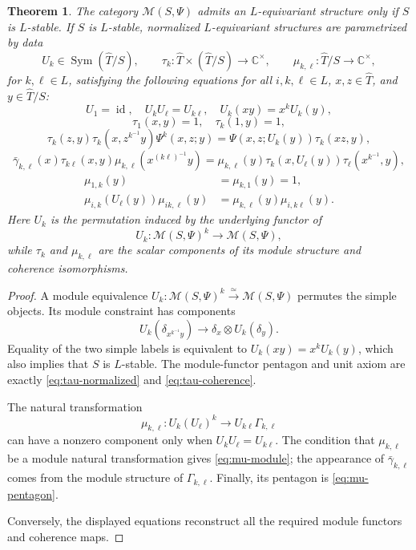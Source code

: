\documentclass{amsart}
\newtheorem{theorem}{Theorem}[section]
\theoremstyle{definition}
\newcommand{\id}{\operatorname{id}}
\newcommand{\M}{\mathscr{M}}
\newcommand{\Ctimes}{\mathbb{C}^{\times}}
\numberwithin{equation}{section}
\begin{document}
\begin{theorem}\label{thm:explicit-equivariant-data}
The category $\M(S,\Psi)$ admits an $L$-equivariant structure only if $S$ is
$L$-stable.  If $S$ is $L$-stable, normalized $L$-equivariant structures are
parametrized by data
\[
 U_k\in\operatorname{Sym}(\widehat{T}/S),
 \qquad
 \tau_k:\widehat{T}\times (\widehat{T}/S)\to\Ctimes,
 \qquad
 \mu_{k,\ell}:\widehat{T}/S\to\Ctimes,
\]
for $k,\ell\in L$, satisfying the following equations for all
$i,k,\ell\in L$, $x,z\in \widehat{T}$, and $y\in \widehat{T}/S$:
\begin{equation}
 U_1=\id,\quad
 U_kU_\ell=U_{k\ell},\quad
 U_k(xy)=x^kU_k(y),
 \label{eq:U-data}
 \end{equation}
 \begin{equation}
 \tau_1(x,y)=1,\quad
 \tau_k(1,y)=1,
 \label{eq:tau-normalized}
\end{equation}
\begin{equation}\label{eq:tau-coherence}
 \tau_k(z,y)\tau_k(x,z^{k^{-1}}y)\Psi^k(x,z;y)
 =\Psi(x,z;U_k(y))\tau_k(xz,y),
\end{equation}
\begin{equation}\label{eq:mu-module}
 \bar\gamma_{k,\ell}(x)\tau_{k\ell}(x,y)
 \mu_{k,\ell}(x^{(k\ell)^{-1}}y)
 =\mu_{k,\ell}(y)\tau_k(x,U_\ell(y))
 \tau_\ell(x^{k^{-1}},y),
 \end{equation}
\begin{align}
 \mu_{1,k}(y)&=\mu_{k,1}(y)=1,
 \label{eq:mu-normalized}\\
 \mu_{i,k}(U_\ell(y))\mu_{ik,\ell}(y)
 &=\mu_{k,\ell}(y)\mu_{i,k\ell}(y).
 \label{eq:mu-pentagon}
\end{align}
Here $U_k$ is the permutation induced by the underlying functor of
$$U_k:\M(S,\Psi)^k\to\M(S,\Psi),$$
while $\tau_k$ and $\mu_{k,\ell}$ are the scalar
components of its module structure and coherence isomorphisms.
\end{theorem}

\begin{proof}
A module equivalence $U_k:\M(S,\Psi)^k\xrightarrow{\simeq}\M(S,\Psi)$ permutes the simple objects.
Its module constraint has components
\[
 U_k(\delta_{x^{k^{-1}}y})\longrightarrow
 \delta_x\otimes U_k(\delta_y).
\]
Equality of the two simple labels is equivalent to
$U_k(xy)=x^kU_k(y)$, which also implies that $S$ is $L$-stable.  The module-functor
pentagon and unit axiom are exactly \eqref{eq:tau-normalized} and
\eqref{eq:tau-coherence}.

The natural transformation
\[
 \mu_{k,\ell}:U_k(U_\ell)^k
 \longrightarrow U_{k\ell}\Gamma_{k,\ell}
\]
can have a nonzero component only when $U_kU_\ell=U_{k\ell}$.  The condition that
$\mu_{k,\ell}$ be a module natural transformation gives
\eqref{eq:mu-module}; the appearance of $\bar\gamma_{k,\ell}$ comes from the module
structure of $\Gamma_{k,\ell}$.  Finally, its pentagon is
\eqref{eq:mu-pentagon}.  

Conversely, the displayed equations reconstruct all the
required module functors and coherence maps.
\end{proof}
\end{document}
